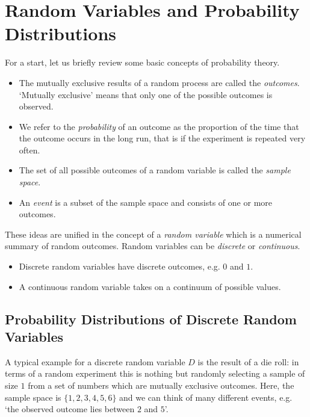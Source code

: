 \documentclass[]{book}
\providecommand{\tightlist}{%
  \setlength{\itemsep}{0pt}\setlength{\parskip}{0pt}}
\theoremstyle{definition}
\theoremstyle{definition}
\theoremstyle{definition}
\theoremstyle{remark}
\begin{document}
\section{Random Variables and Probability
Distributions}\label{random-variables-and-probability-distributions}

For a start, let us briefly review some basic concepts of probability
theory.

\begin{itemize}
\tightlist
\item
  The mutually exclusive results of a random process are called the
  \emph{outcomes}. `Mutually exclusive' means that only one of the
  possible outcomes is observed.
\item
  We refer to the \emph{probability} of an outcome as the proportion of
  the time that the outcome occurs in the long run, that is if the
  experiment is repeated very often.
\item
  The set of all possible outcomes of a random variable is called the
  \emph{sample space}.
\item
  An \emph{event} is a subset of the sample space and consists of one or
  more outcomes.
\end{itemize}

These ideas are unified in the concept of a \emph{random variable} which
is a numerical summary of random outcomes. Random variables can be
\emph{discrete} or \emph{continuous}.

\begin{itemize}
\tightlist
\item
  Discrete random variables have discrete outcomes, e.g. \(0\) and
  \(1\).
\item
  A continuous random variable takes on a continuum of possible values.
\end{itemize}

\subsection*{Probability Distributions of Discrete Random
Variables}\label{probability-distributions-of-discrete-random-variables}

A typical example for a discrete random variable \(D\) is the result of
a die roll: in terms of a random experiment this is nothing but randomly
selecting a sample of size \(1\) from a set of numbers which are
mutually exclusive outcomes. Here, the sample space is
\(\{1,2,3,4,5,6\}\) and we can think of many different events, e.g. `the
observed outcome lies between \(2\) and \(5\)'.
\end{document}
